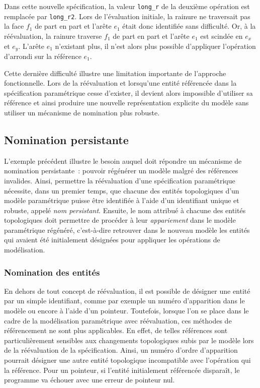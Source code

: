 Dans cette nouvelle spécification, la valeur
\texttt{long\_r} de la deuxième opération est remplacée par
\texttt{long\_r2}. %
Lors de l'évaluation initiale, la rainure ne traversait pas la face $f_{1}$ de
part en part et l'arête $e_{1}$ était donc identifiée sans difficulté. %
Or, à la réévaluation, la rainure traverse $f_{1}$ de part en part et l'arête
$e_{1}$ est scindée en $e_{x}$ et $e_{y}$. %
L'arête $e_{1}$ n'existant plus, il n'est alors plus possible
d'appliquer l'opération d'arrondi sur la référence $e_{1}$. %

Cette dernière difficulté illustre une limitation importante de l'approche fonctionnelle. %
Lors de la réévaluation et lorsqu'une entité référencée dans la spécification
paramétrique cesse d'exister, il devient alors impossible d'utiliser sa
référence et ainsi produire une	nouvelle représentation explicite du modèle sans utiliser un mécanisme de nomination plus robuste. %

\subsection{Nomination persistante}
\label{sec:etat-art-reevaluation-nomination-persistante}

L'exemple précédent illustre le besoin auquel doit répondre un mécanisme de nomination persistante~: pouvoir régénérer un modèle malgré des références invalides. %
Ainsi, permettre la réévaluation d'une spécification paramétrique nécessite,
dans un premier temps, que chacune des entités topologiques d'un modèle paramétrique
puisse être identifiée à l'aide d'un identifiant unique et robuste, appelé
\emph{nom persistant}. %
Ensuite, le nom attribué à chacune des entités topologiques doit permettre de
procéder à leur \emph{appariement} dans le modèle paramétrique régénéré,
c'est-à-dire retrouver dans le nouveau modèle les entités qui avaient été
initialement désignées pour appliquer les opérations de modélisation. %


\subsubsection{Nomination des entités} \label{sec:etat-art-modelisation-parametric-nomination-utilisation-nom}


En dehors de tout concept de réévaluation, il est possible de désigner une
entité par un simple identifiant, comme par exemple un numéro d'apparition dans le modèle ou encore à l'aide d'un
pointeur. %
Toutefois, lorsque l'on se place dans le cadre de la modélisation paramétrique
avec réévaluation, ces méthodes de référencement ne sont plus
applicables. %
En effet, de telles références sont particulièrement sensibles aux changements topologiques
subis par le modèle lors de la réévaluation de la spécification. %
Ainsi, un numéro d'ordre d'apparition pourrait désigner une autre entité
topologique incompatible avec l'opération qui la référence. %
Pour un pointeur, si l'entité initialement référencée disparaît, le
programme va échouer avec une erreur de pointeur nul. %

